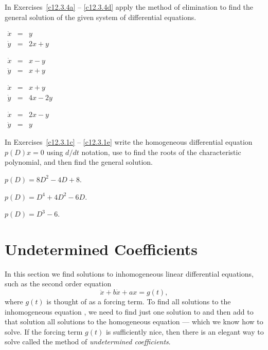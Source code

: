 \documentclass{ximera}
\begin{document}
\noindent In Exercises~\ref{c12.3.4a} -- \ref{c12.3.4d} apply the
method of elimination to find the general solution of the given
system of differential equations.
\begin{exercise} \label{c12.3.4a}
$\begin{array}{rcl}
\dot{x} & = & y\\
\dot{y} & = & 2x+y
\end{array}$
\end{exercise}
\begin{exercise} \label{c12.3.4b}
$\begin{array}{rcl}
\dot{x} & = & x-y\\
\dot{y} & = & x+y
\end{array}$
\end{exercise}
\begin{exercise} \label{c12.3.4c}
$\begin{array}{rcl}
\dot{x} & = & x+y\\
\dot{y} & = & 4x-2y
\end{array}$
\end{exercise}
\begin{exercise} \label{c12.3.4d}
$\begin{array}{rcl}
\dot{x} & = & 2x-y\\
\dot{y} & = & y
\end{array}$
\end{exercise}

\CEXER

\noindent In Exercises~\ref{c12.3.1c} -- \ref{c12.3.1e} write the 
homogeneous differential equation $p(D)x=0$ using $d/dt$ notation,
use \Matlab to find the roots of the characteristic polynomial, and 
then find the general solution.
\begin{exercise}  \label{c12.3.1c}
$p(D) = 8D^2 - 4D +8$.
\end{exercise}
\begin{exercise}  \label{c12.3.1d}
$p(D) = D^4 + 4D^2 - 6D$.
\end{exercise}
\begin{exercise}  \label{c12.3.1e}
$p(D) = D^3 -6$.
\end{exercise}

\section{Undetermined Coefficients}
\label{sec:2norderinhom}

In this section we find solutions to inhomogeneous linear differential 
equations, such as the second order equation
\begin{equation}  \label{e:inhom1}
\ddot{x} + b\dot{x} + ax = g(t),
\end{equation}
where $g(t)$ is thought of as a forcing term.   
To find all solutions to 
the inhomogeneous 
equation , we need to find just one solution
to  and then add to that solution all solutions to the 
homogeneous equation --- which we know how to solve.  If the forcing term 
$g(t)$ is sufficiently nice, then there is an elegant way to solve 
 called the method of 
{\em undetermined coefficients}.
\end{document}
